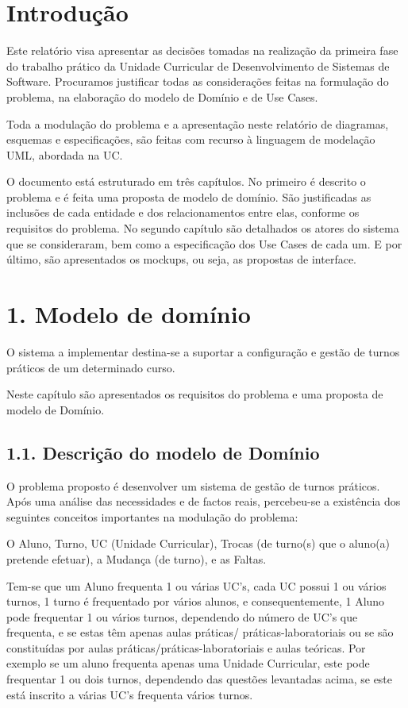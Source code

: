 \documentclass[12pt,a4paper]{report}
\begin{document}
\chapter{Introdução}

Este relatório visa apresentar as decisões tomadas na realização da primeira fase do
trabalho prático da Unidade Curricular de Desenvolvimento de Sistemas de Software.
Procuramos justificar todas as considerações feitas na formulação do problema, na
elaboração do modelo de Domínio e de Use Cases.

Toda a modulação do problema e a apresentação neste relatório de diagramas,
esquemas e especificações, são feitas com recurso à linguagem de modelação UML,
abordada na UC.

O documento está estruturado em três capítulos. No primeiro é descrito o problema
e é feita uma proposta de modelo de domínio. São justificadas as inclusões de cada
entidade e dos relacionamentos entre elas, conforme os requisitos do problema. No
segundo capítulo são detalhados os atores do sistema que se consideraram, bem como a
especificação dos Use Cases de cada um. E por último, são apresentados os mockups, ou
seja, as propostas de interface.

\chapter{1. Modelo de domínio}
O sistema a implementar destina-se a suportar a configuração e gestão de turnos
práticos de um determinado curso.

Neste capítulo são apresentados os requisitos do problema e uma proposta de
modelo de Domínio.
\section{1.1. Descrição do modelo de Domínio}
O problema proposto é desenvolver um sistema de gestão de turnos práticos. Após
uma análise das necessidades e de factos reais, percebeu-se a existência dos seguintes
conceitos importantes na modulação do problema:

O Aluno, Turno, UC (Unidade Curricular), Trocas (de turno(s) que o aluno(a)
pretende efetuar), a Mudança (de turno), e as Faltas.

Tem-se que um Aluno frequenta 1 ou várias UC’s, cada UC possui 1 ou vários
turnos, 1 turno é frequentado por vários alunos, e consequentemente, 1 Aluno pode
frequentar 1 ou vários turnos, dependendo do número de UC’s que frequenta, e se estas
têm apenas aulas práticas/ práticas-laboratoriais ou se são constituídas por aulas
práticas/práticas-laboratoriais e aulas teóricas. Por exemplo se um aluno frequenta apenas
uma Unidade Curricular, este pode frequentar 1 ou dois turnos, dependendo das questões
levantadas acima, se este está inscrito a várias UC’s frequenta vários turnos.
\end{document}
